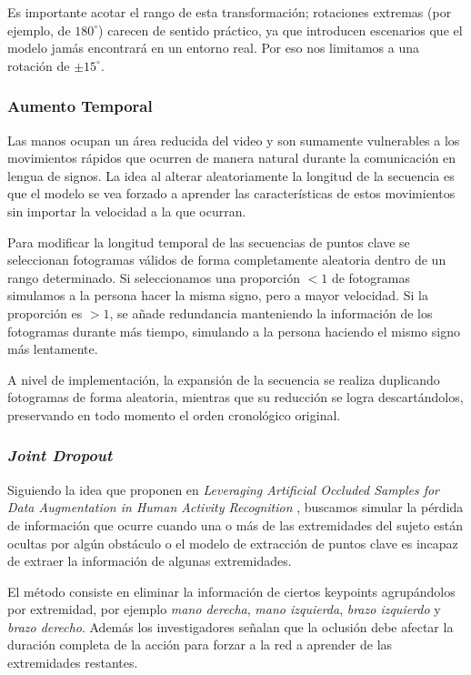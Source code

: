 Es importante acotar el rango de esta transformación; rotaciones extremas (por ejemplo, de $180^{\circ}$) carecen de sentido práctico, ya que introducen escenarios que el modelo jamás encontrará en un entorno real.
Por eso nos limitamos a una rotación de $\pm15^{\circ}$.


\subsubsection*{Aumento Temporal}
Las manos ocupan un área reducida del video y son sumamente vulnerables a los movimientos rápidos que ocurren de manera natural durante la comunicación en lengua de signos.
La idea al alterar aleatoriamente la longitud de la secuencia es que el modelo se vea forzado a aprender las características de estos movimientos sin importar la velocidad a la que ocurran.

Para modificar la longitud temporal de las secuencias de puntos clave se seleccionan fotogramas válidos de forma completamente aleatoria dentro de un rango determinado.
Si seleccionamos una proporción $<1$ de fotogramas simulamos a la persona hacer la misma signo, pero a mayor velocidad.
Si la proporción es $>1$, se añade redundancia manteniendo la información de los fotogramas durante más tiempo, simulando a la persona haciendo el mismo signo más lentamente.

A nivel de implementación, la expansión de la secuencia se realiza duplicando fotogramas de forma aleatoria, mientras que su reducción se logra descartándolos, preservando en todo momento el orden cronológico original.

\subsubsection*{\textit{Joint Dropout}}
Siguiendo la idea que proponen en \textit{Leveraging Artificial Occluded Samples for Data Augmentation in Human Activity Recognition} \cite{JDrop}, buscamos simular la pérdida de información que ocurre cuando una o más de las extremidades del sujeto están ocultas por algún obstáculo o el modelo de extracción de puntos clave es incapaz de extraer la información de algunas extremidades.

El método consiste en eliminar la información de ciertos keypoints agrupándolos por extremidad, por ejemplo \textit{mano derecha}, \textit{mano izquierda}, \textit{brazo izquierdo} y \textit{brazo derecho}.
Además los investigadores señalan que la oclusión debe afectar la duración completa de la acción para forzar a la red a aprender de las extremidades restantes.

